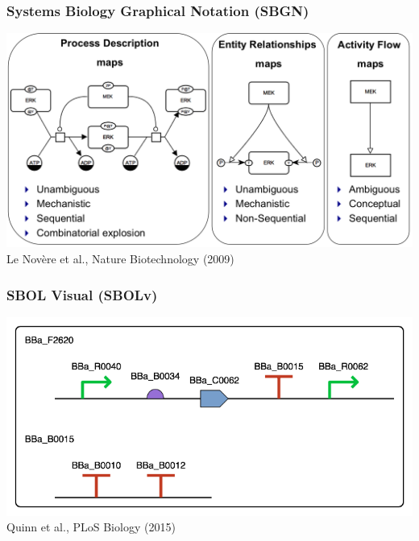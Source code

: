 \documentclass{beamer}
\begin{document}
\begin{frame}\frametitle{Systems Biology Graphical Notation (SBGN)}
\begin{center}
\includegraphics[width=\textwidth]{figs/SBGN2}\\
Le Nov\`{e}re et al., Nature Biotechnology (2009)
\end{center}
\end{frame}

\begin{frame}\frametitle{SBOL Visual (SBOLv)}
\begin{center}
\includegraphics[width=\textwidth]{figs/SBOLExample}\\
Quinn et al., PLoS Biology (2015)
\end{center}
\end{frame}
\end{document}
